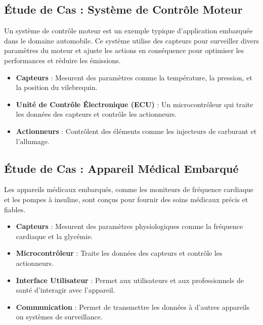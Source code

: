 \documentclass[10pt,a4paper]{article}
\begin{document}

\subsection*{Étude de Cas : Système de Contrôle Moteur}

Un système de contrôle moteur est un exemple typique d'application embarquée dans le domaine automobile. Ce système utilise des capteurs pour surveiller divers paramètres du moteur et ajuste les actions en conséquence pour optimiser les performances et réduire les émissions.

\begin{itemize}
    \item \textbf{Capteurs} : Mesurent des paramètres comme la température, la pression, et la position du vilebrequin.
    \item \textbf{Unité de Contrôle Électronique (ECU)} : Un microcontrôleur qui traite les données des capteurs et contrôle les actionneurs.
    \item \textbf{Actionneurs} : Contrôlent des éléments comme les injecteurs de carburant et l'allumage.
\end{itemize}


\subsection*{Étude de Cas : Appareil Médical Embarqué}

Les appareils médicaux embarqués, comme les moniteurs de fréquence cardiaque et les pompes à insuline, sont conçus pour fournir des soins médicaux précis et fiables.

\begin{itemize}
    \item \textbf{Capteurs} : Mesurent des paramètres physiologiques comme la fréquence cardiaque et la glycémie.
    \item \textbf{Microcontrôleur} : Traite les données des capteurs et contrôle les actionneurs.
    \item \textbf{Interface Utilisateur} : Permet aux utilisateurs et aux professionnels de santé d'interagir avec l'appareil.
    \item \textbf{Communication} : Permet de transmettre les données à d'autres appareils ou systèmes de surveillance.
\end{itemize}
\end{document}
